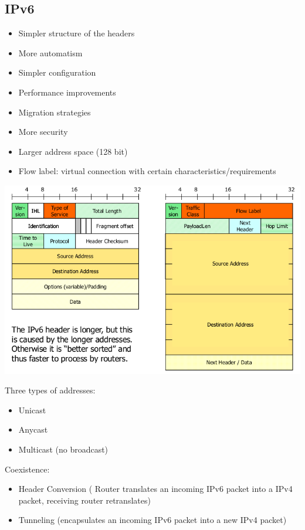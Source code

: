 \documentclass[11pt,ngerman]{article}
\begin{document}
\subsection{IPv6}
\begin{itemize}[noitemsep,nolistsep]
\item Simpler structure of the headers
\item More automatism
\item Simpler configuration
\item Performance improvements
\item Migration strategies
\item More security
\item Larger address space (128 bit)
\item Flow	label: virtual	connection	with	certain	
characteristics/requirements
\end{itemize}

\includegraphics[width=6in]{images/Selection_019.png}

\noindent Three types of addresses:
\begin{itemize}[noitemsep,nolistsep]
\item Unicast
\item Anycast
\item Multicast (no broadcast)\\
\end{itemize}

Coexistence: 
\begin{itemize}[noitemsep,nolistsep]
\item Header Conversion ( Router	translates	an	incoming	IPv6	packet	into	a	IPv4	
packet,	receiving	router	retranslates)
\item  Tunneling  (encapsulates	an	incoming	IPv6	packet	into	
a	new	IPv4	packet)
\end{itemize}
\end{document}
